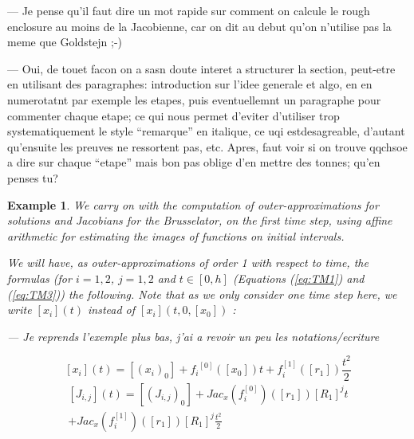 \documentclass{sig-alternate-05-2015} %
\newcommand\ForAuthors[1]%
 {\par\smallskip                     %
  \begin{center}%
   \fbox%
   {\parbox{0.9\linewidth}%
    {\raggedright\sc--- #1}%
   }%
  \end{center}%
  \par\smallskip                     %
 }
\newtheorem{example}{Example}
\def\int#1{\mbox{$[ #1 ]$}}
\begin{document}
\ForAuthors{Je pense qu'il faut dire un mot rapide sur comment on calcule le rough
enclosure au moins de la Jacobienne, car on dit au debut qu'on n'utilise pas la meme que Goldstejn ;-)}
\ForAuthors{Oui, de touet facon on a sasn doute interet a structurer la section, peut-etre en 
utilisant des paragraphes: introduction sur l'idee generale et algo, en en numerotatnt par exemple les etapes, 
puis eventuellemnt un paragraphe pour commenter chaque etape; ce qui nous permet d'eviter d'utiliser trop systematiquement
le style ``remarque'' en italique, ce uqi estdesagreable, d'autant qu'ensuite les preuves ne ressortent pas, etc. 
Apres, faut voir si on trouve qqchsoe a dire sur chaque ``etape'' mais bon pas oblige d'en mettre des tonnes; qu'en penses tu?}
\begin{example}
\label{running2}
We carry on with the computation of outer-approximations for solutions and Jacobians for 
the Brusselator, on the first time
step, using affine arithmetic for estimating the images of functions on initial intervals.


We will have, as outer-approximations of order 1 with respect to time, the formulas (for $i=1, 2$, $j=1, 2$
and $t \in [0,h]$ (Equations (\ref{eq:TM1}) and (\ref{eq:TM3})) the following. Note that
as we only consider one time step here, we write $\int{x_i}(t)$ instead of $\int{x_i}(t,0,\int{x_0})$ :  

\ForAuthors{Je reprends l'exemple plus bas, j'ai a revoir un peu les notations/ecriture}

\begin{equation}
\int{x_i}(t) = \int{(x_i)_0} + {f_i}^{[0]}(\int{x_0}) t + f_i^{[1]}(\int{r_1}) \frac{t^2}{2}
\end{equation}
\begin{multline}
\int{J_{i,j}}(t) =  \int{(J_{i,j})_0}+Jac_x(f_{i}^{[0]})(\int{r_1})\int{R_1}^j t \\
+ Jac_x(f_{i}^{[1]})(\int{r_1})\int{R_1}^j \frac{t^2}{2} 
\label{TaylorJ}
\end{multline}



\end{example}
\end{document}
